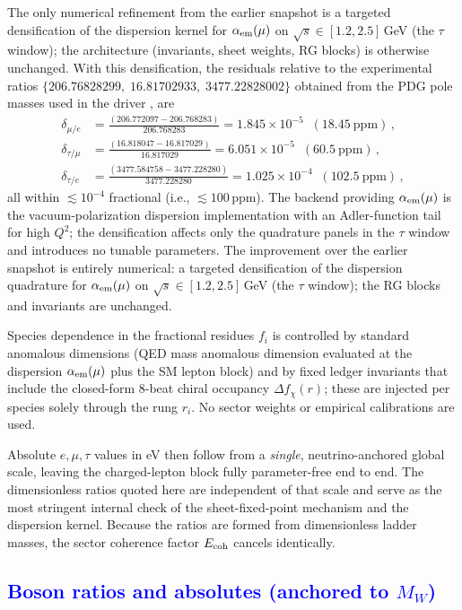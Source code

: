 \documentclass[%
amsmath,amssymb,
aps,
prb,
floatfix,showkeys
]{revtex4-2}
\newcommand{\modif}[1]{\textcolor{blue}{#1}}
\begin{document}
The only numerical refinement from the earlier snapshot is a targeted densification of the dispersion kernel for $\alpha_{\rm em}(\mu)$ on $\sqrt{s}\!\in[1.2,2.5]\,$GeV (the $\tau$ window); the architecture (invariants, sheet weights, RG blocks) is otherwise unchanged. With this densification, the residuals relative to the experimental ratios $\{206.76828299,\; 16.81702933,\; 3477.22828002\}$ obtained from the PDG pole masses used in the driver \cite{PDG2024}, are
\begin{align}
\delta_{\mu/e} &= \frac{(206.772097-206.768283)}{206.768283} = 1.845\times 10^{-5}\;\;(18.45~\mathrm{ppm})\,,\nonumber\\
\delta_{\tau/\mu} &= \frac{(16.818047-16.817029)}{16.817029} = 6.051\times 10^{-5}\;\;(60.5~\mathrm{ppm})\,,\\
\delta_{\tau/e} &= \frac{(3477.584758-3477.228280)}{3477.228280} = 1.025\times 10^{-4}\;\;(102.5~\mathrm{ppm})\,,\nonumber
\end{align}
all within $\lesssim 10^{-4}$ fractional (i.e., $\lesssim 100$\,ppm). The backend providing $\alpha_{\rm em}(\mu)$ is the vacuum-polarization dispersion implementation with an Adler-function tail for high $Q^2$; the densification affects only the quadrature panels in the $\tau$ window and introduces no tunable parameters. The improvement over the earlier snapshot is entirely numerical: a targeted densification of the dispersion quadrature for $\alpha_{\rm em}(\mu)$ on $\sqrt{s}\!\in[1.2,2.5]\,$GeV (the $\tau$ window); the RG blocks and invariants are unchanged.

Species dependence in the fractional residues $f_i$ is controlled by standard anomalous dimensions (QED mass anomalous dimension evaluated at the dispersion $\alpha_{\rm em}(\mu)$ plus the SM lepton block) and by fixed ledger invariants that include the closed-form 8-beat chiral occupancy $\Delta f_\chi(r)$; these are injected per species solely through the rung $r_i$. No sector weights or empirical calibrations are used.

Absolute $e,\mu,\tau$ values in eV then follow from a \emph{single}, neutrino-anchored global scale, leaving the charged-lepton block fully parameter-free end to end. The dimensionless ratios quoted here are independent of that scale and serve as the most stringent internal check of the sheet-fixed-point mechanism and the dispersion kernel. Because the ratios are formed from dimensionless ladder masses, the sector coherence factor $E_{\rm coh}$ cancels identically.

{\modif{\subsection{Boson ratios and absolutes (anchored to $M_W$)}
\label{subsec:bosons}}}
\end{document}
